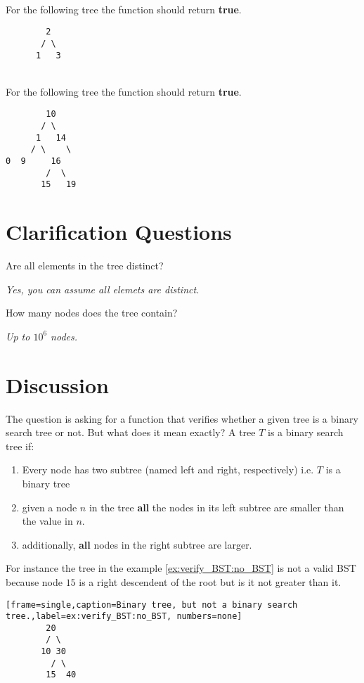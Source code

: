\begin{example}
	\hfill \\
	For the following tree the function should return \textbf{true}.
	\begin{verbatim}
	    2
	   / \
	  1   3
	\end{verbatim}
	
\end{example}

\begin{example}
\label{example:verify_BST_:one}
	\hfill \\
	For the following tree the function should return \textbf{true}.
	\begin{verbatim}
	    10
	   / \
	  1   14
	 / \    \
0  9     16
        /  \
       15   19
	\end{verbatim}
	
\end{example}


\section{Clarification Questions}

\begin{QandA}
	\item Are all elements in the tree distinct?
	\begin{answered}
		\textit{Yes, you can assume all elemets are distinct.}
	\end{answered}
	\item How many nodes does the tree contain?
	\begin{answered}
		\textit{Up to $10^6$ nodes.}
	\end{answered}
\end{QandA}

\section{Discussion}
\label{verify_BST:sec:discussion}
The question is asking for a function that verifies whether a given tree is a binary search tree or not. But what does it mean exactly?
A tree $T$ is a binary search tree if:
\begin{enumerate}
	\item Every node has two subtree (named left and right, respectively) i.e. $T$ is a binary tree
	\item given a node $n$ in the tree \textbf{all} the nodes in its left subtree are smaller than the value in $n$.
	\item additionally,  \textbf{all} nodes in the right subtree are larger.
\end{enumerate}
For instance the tree in the example \ref{ex:verify_BST:no_BST} is not a valid BST because node $15$ is a right descendent of the root but is it not greater than it. 
\begin{lstlisting}[frame=single,caption=Binary tree, but not a binary search tree.,label=ex:verify_BST:no_BST, numbers=none]
	    20
	    / \
	   10 30
	     / \
	    15  40
\end{lstlisting}


